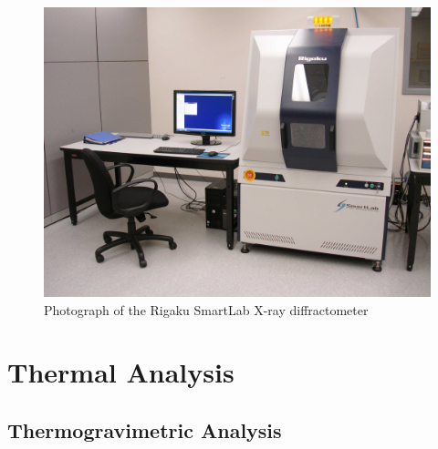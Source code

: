 
\begin{figure}[htbp]
   \centering
   \includegraphics[width=0.75\linewidth]{./figures/characterization/rigaku-smartlab-photo.jpg} 
   \caption[Rigaku SmartLab XRD]%
   		{Photograph of the Rigaku SmartLab X-ray diffractometer}
   \label{fig:rigaku-smartlab-photo}
\end{figure}



%


\section{Thermal Analysis}
\label{sec:Charact-Thermal}


\subsection{Thermogravimetric Analysis}

